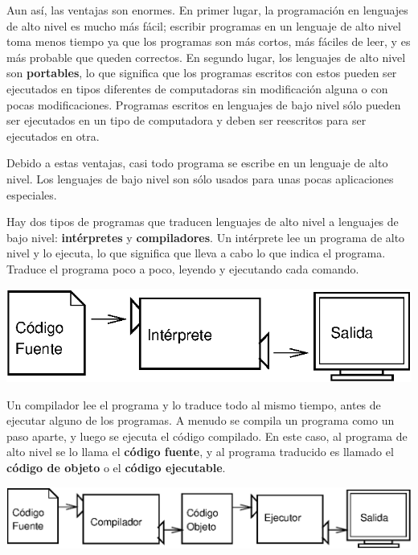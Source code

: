   
 

Aun así, las ventajas son enormes. En primer lugar, la programación
en lenguajes de alto nivel es mucho más fácil; escribir programas
en un lenguaje de alto nivel toma menos tiempo ya que los programas
son más cortos, más fáciles de leer, y es más probable que queden
correctos. En segundo lugar, los lenguajes de alto nivel son \textbf{portables},
lo que significa que los programas escritos con estos pueden ser ejecutados
en tipos diferentes de computadoras sin modificación alguna o con
pocas modificaciones. Programas escritos en lenguajes de bajo nivel
sólo pueden ser ejecutados en un tipo de computadora y deben ser reescritos
para ser ejecutados en otra.

Debido a estas ventajas, casi todo programa se escribe en un lenguaje
de alto nivel. Los lenguajes de bajo nivel son sólo usados para unas
pocas aplicaciones especiales.

 

Hay dos tipos de programas que traducen lenguajes de alto nivel a
lenguajes de bajo nivel: \textbf{intérpretes} y \textbf{compiladores}.
Un intérprete lee un programa de alto nivel y lo ejecuta, lo que significa
que lleva a cabo lo que indica el programa. Traduce el programa poco
a poco, leyendo y ejecutando cada comando.

\vspace{0.1in}
 \centerline{\includegraphics[scale=0.7]{illustrations/interpret}}
\vspace{0.1in}

Un compilador lee el programa y lo traduce todo al mismo tiempo, antes
de ejecutar alguno de los programas. A menudo se compila un programa
como un paso aparte, y luego se ejecuta el código compilado. En este
caso, al programa de alto nivel se lo llama el \textbf{código fuente},
y al programa traducido es llamado el \textbf{código de objeto} o
el \textbf{código ejecutable}.

\vspace{0.1in}
 \centerline{\includegraphics[scale=0.7]{illustrations/compile}}
\vspace{0.1in}

